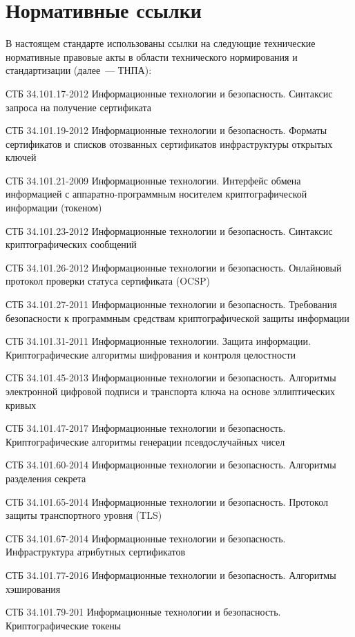 \chapter{Нормативные ссылки}

В настоящем стандарте использованы ссылки на следующие технические 
нормативные правовые акты в области технического нормирования и 
стандартизации (далее~--– ТНПА): 
 
СТБ 34.101.17-2012 Информационные технологии и безопасность. Синтаксис 
запроса на получение сертификата

СТБ 34.101.19-2012 Информационные технологии и безопасность. Форматы 
сертификатов и списков отозванных сертификатов инфраструктуры открытых 
ключей 

СТБ 34.101.21-2009 Информационные технологии. Интерфейс обмена информацией
с аппаратно-программным носителем криптографической информации (токеном)

СТБ 34.101.23-2012 Информационные технологии и безопасность. Синтаксис 
криптографических сообщений

СТБ 34.101.26-2012 Информационные технологии и безопасность. Онлайновый 
протокол проверки статуса сертификата (OCSP)

СТБ 34.101.27-2011 Информационные технологии и безопасность. Требования 
безопасности к программным средствам криптографической защиты информации 

СТБ 34.101.31-2011 Информационные технологии. Защита информации. 
Криптографические алгоритмы шифрования и контроля целостности

СТБ 34.101.45-2013 Информационные технологии и безопасность. 
Алгоритмы электронной цифровой подписи и транспорта ключа на основе 
эллиптических кривых

СТБ 34.101.47-2017 Информационные технологии и безопасность. 
Криптографические алгоритмы генерации псевдослучайных чисел 

СТБ 34.101.60-2014 Информационные технологии и безопасность. 
Алгоритмы разделения секрета

СТБ 34.101.65-2014 Информационные технологии и безопасность. 
Протокол защиты транспортного уровня (TLS)

СТБ 34.101.67-2014 Информационные технологии и безопасность. 
Инфраструктура атрибутных сертификатов 

СТБ 34.101.77-2016 Информационные технологии и безопасность. 
Алгоритмы хэширования

СТБ 34.101.79-201 
Информационные технологии и безопасность. Криптографические токены

